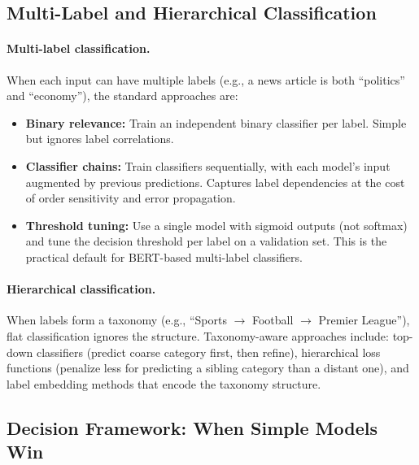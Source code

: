 \subsection{Multi-Label and Hierarchical Classification}

\paragraph{Multi-label classification.}
When each input can have multiple labels (e.g., a news article is both ``politics'' and
``economy''), the standard approaches are:
\begin{itemize}
    \item \textbf{Binary relevance:} Train an independent binary classifier per label.  Simple
          but ignores label correlations.
    \item \textbf{Classifier chains:} Train classifiers sequentially, with each model's input
          augmented by previous predictions.  Captures label dependencies at the cost of order
          sensitivity and error propagation.
    \item \textbf{Threshold tuning:} Use a single model with sigmoid outputs (not softmax) and
          tune the decision threshold per label on a validation set.  This is the practical
          default for BERT-based multi-label classifiers.
\end{itemize}

\paragraph{Hierarchical classification.}
When labels form a taxonomy (e.g., ``Sports $\to$ Football $\to$ Premier League''), flat
classification ignores the structure.  Taxonomy-aware approaches include: top-down classifiers
(predict coarse category first, then refine), hierarchical loss functions (penalize less for
predicting a sibling category than a distant one), and label embedding methods that encode the
taxonomy structure.

\subsection{Decision Framework: When Simple Models Win}

